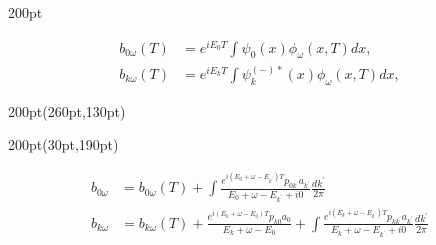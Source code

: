 \begin{frame}
\begin{textblock*}{200pt}
{\begin{minipage}{\linewidth}
{\footnotesize
\begin{align}
b_{0\omega}(T) & = e^{iE_0T} \int \psi_0(x) \phi_\omega(x,T) dx, \nonumber \\
b_{k\omega}(T) & = e^{iE_kT} \int \psi_k^{(-)*}(x) \phi_\omega(x,T) dx\nonumber,
\end{align}
}
\end{minipage}
}
\end{textblock*}



\begin{textblock*}{200pt}(260pt,130pt)
\end{textblock*}





\begin{textblock*}{200pt}(30pt,190pt)
\footnotesize

\begin{align}
b_{0\omega} & = b_{0\omega}(T)
 +\int\frac{e^{i(E_0+\omega-E_{k^\prime})T}p_{0k^\prime}a_{k^\prime}}
{E_0+\omega-E_{k^\prime} + i0} \frac{dk^\prime}{2\pi} \nonumber\\
b_{k\omega} & = b_{k\omega}(T)
 +\frac{e^{i(E_k+\omega-E_0)T}p_{k0}a_0}{E_k+\omega-E_0}
 +\int\frac{e^{i(E_k+\omega-E_{k^\prime})T}p_{kk^\prime}a_{k^\prime}}
{E_k+\omega-E_{k^\prime} + i0} \frac{dk^\prime}{2\pi} \nonumber
\end{align}


\end{textblock*}
\end{frame}
